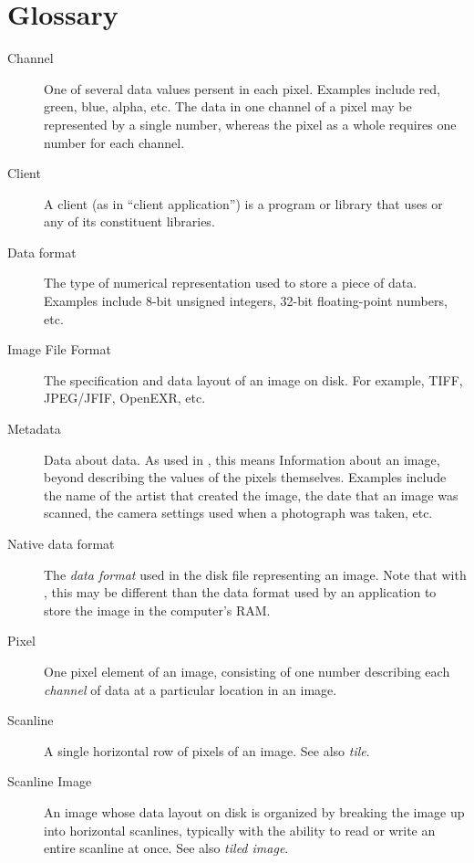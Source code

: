 \chapter{Glossary}

\begin{description}

\item[Channel] One of several data values persent in each pixel.
  Examples include red, green, blue, alpha, etc.  The data in one
  channel of a pixel may be represented by a single number, whereas the
  pixel as a whole requires one number for each channel.

\item[Client] A client (as in ``client application'') is a program or
  library that uses \product or any of its constituent libraries.

\item[Data format] The type of numerical representation used to
  store a piece of data.  Examples include 8-bit unsigned integers,
  32-bit floating-point numbers, etc.

\item[Image File Format] The specification and data layout of an
  image on disk.  For example, TIFF, JPEG/JFIF, OpenEXR, etc.

\item[Metadata] Data about data.  As used in \product, this means
  Information about an image, beyond describing the values of the pixels
  themselves.  Examples include the name of the artist that created the
  image, the date that an image was scanned, the camera settings used
  when a photograph was taken, etc.

\item[Native data format] The \emph{data format} used in the disk file
  representing an image.  Note that with \product, this may be different
  than the data format used by an application to store the image
  in the computer's RAM.

\item[Pixel] One pixel element of an image, consisting of one number
  describing each \emph{channel} of data at a particular location in an
  image.

\item[Scanline] A single horizontal row of pixels of an image.  See also
  \emph{tile}.

\item[Scanline Image] An image whose data layout on disk is organized by
  breaking the image up into horizontal scanlines, typically with the
  ability to read or write an entire scanline at once.  See also
  \emph{tiled image}.


\end{description}
